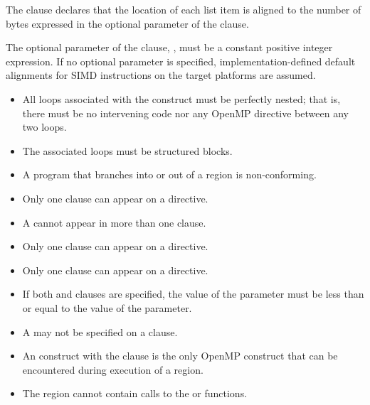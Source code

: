 \fortranspecificstart

The  clause declares that the location of each list item
is aligned to the number of bytes expressed in the optional parameter
of the  clause.

\fortranspecificend

The optional parameter of the  clause, , must be a constant positive 
integer expression. If no optional parameter is specified, implementation-defined default 
alignments for SIMD instructions on the target platforms are assumed.

\restrictions
\begin{itemize}
\item All loops associated with the construct must be perfectly nested; that is, there must be 
no intervening code nor any OpenMP directive between any two loops.

\item The associated loops must be structured blocks.

\item A program that branches into or out of a  region is non-conforming. 

\item Only one  clause can appear on a  directive.

\item A  cannot appear in more than one  clause.

\item Only one  clause can appear on a  directive.

\item Only one  clause can appear on a  directive.

\item If both  and  clauses are specified, the value of the  parameter must be less than or equal to the value of the  parameter.

\item A  may not be specified on a  clause.

\item An  construct with the  clause is the only OpenMP
construct that can be encountered during execution of a 
region.

\ccppspecificstart
\item The  region cannot contain calls to the  or  functions. 
\ccppspecificend
\bigskip


\end{itemize}
